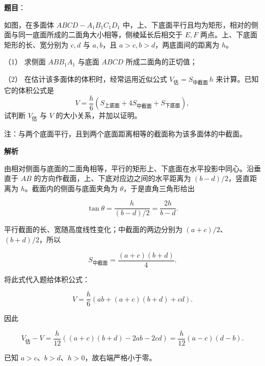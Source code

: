 \begin{answer}

\textbf{题目}：

如图，在多面体 \(ABCD-A_1B_1C_1D_1\) 中，上、下底面平行且均为矩形，相对的侧面与同一底面所成的二面角大小相等，侧棱延长后相交于 \(E,F\) 两点。上、下底面矩形的长、宽分别为 \(c,d\) 与 \(a,b\)，且 \(a>c,b>d\)，两底面间的距离为 \(h\)。

（1） 求侧面 \(ABB_1A_1\) 与底面 \(ABCD\) 所成二面角的正切值；

（2） 在估计该多面体的体积时，经常运用近似公式 \(V_{\text{估}}=S_{\text{中截面}}\,h\) 来计算。已知它的体积公式是
\nopagebreak[4]
\[
V=\frac{h}{6}\left(S_{\text{上底面}}+4S_{\text{中截面}}+S_{\text{下底面}}\right),
\]
试判断 \(V_{\text{估}}\) 与 \(V\) 的大小关系，并加以证明。

注：与两个底面平行，且到两个底面距离相等的截面称为该多面体的中截面。
\nopagebreak[4]
\begin{center}\end{center}
\nopagebreak[4]
\textbf{解析}


由相对侧面与底面的二面角相等，平行的矩形上、下底面在水平投影中同心。沿垂直于 $AB$ 的方向作截面，上、下底对应边之间的水平距离为 $(b-d)/2$，竖直距离为 $h$。截面内的侧面与底面夹角为 $\theta$，于是直角三角形给出

\nopagebreak[4]
\[\tan\theta=\frac{h}{(b-d)/2}=\frac{2h}{b-d}.\]


平行截面的长、宽随高度线性变化；中截面的两边分别为 $(a+c)/2$、$(b+d)/2$，所以

\nopagebreak[4]
\[S_{\mathrm{\text{中截面}}}=\frac{(a+c)(b+d)}4.\]

将此式代入题给体积公式：

\nopagebreak[4]
\[V=\frac h6\left(ab+(a+c)(b+d)+cd\right).\]

因此

\nopagebreak[4]
\[V_{\mathrm{\text{估}}}-V=\frac h{12}\left((a+c)(b+d)-2ab-2cd\right)
=\frac h{12}(a-c)(d-b).\]

已知 $a>c$、$b>d$、$h>0$，故右端严格小于零。



\end{answer}
